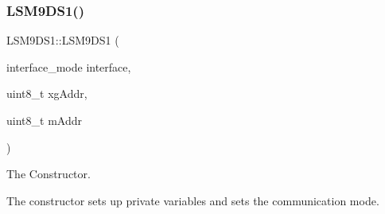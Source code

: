 \subsubsection{\texorpdfstring{L\+S\+M9\+D\+S1()}{LSM9DS1()}}
{\footnotesize\ttfamily L\+S\+M9\+D\+S1\+::\+L\+S\+M9\+D\+S1 (\begin{DoxyParamCaption}\item[{interface\+\_\+mode}]{interface,  }\item[{uint8\+\_\+t}]{xg\+Addr,  }\item[{uint8\+\_\+t}]{m\+Addr }\end{DoxyParamCaption})}



The Constructor. 

The constructor sets up private variables and sets the communication mode.


